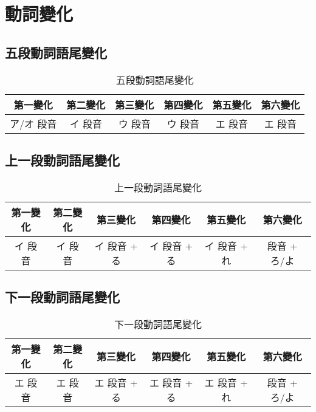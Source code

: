 \documentclass[12pt]{article}
\begin{document}
\begin{CJK}{UTF8}{cybercjk}
\begin{table}[htdp]
\begin{tabular}{cccccccccc}
\hline
\end{tabular}
\end{table}

\section{動詞變化}

\subsection{五段動詞語尾變化}
\begin{table}[htdp]
\begin{tabular}{cccccc}
\hline
第一變化 & 第二變化 & 第三變化 & 第四變化 & 第五變化 & 第六變化 \\
\hline
ア/オ 段音 & イ 段音 & ウ 段音 & ウ 段音  & エ 段音 & エ 段音  \\
\hline
\end{tabular}
\caption{五段動詞語尾變化}
\end{table}

\subsection{上一段動詞語尾變化}
\begin{table}[htdp]
\begin{tabular}{cccccc}
\hline
第一變化 & 第二變化 & 第三變化 & 第四變化 & 第五變化 & 第六變化 \\
\hline
イ 段音 & イ 段音 & イ 段音 + る &  イ 段音 + る &  イ 段音 + れ &  段音 + ろ/よ \\
\hline
\end{tabular}
\caption{上一段動詞語尾變化}
\end{table}

\subsection{下一段動詞語尾變化}
\begin{table}[htdp]
\begin{tabular}{cccccc}
\hline
第一變化 & 第二變化 & 第三變化 & 第四變化 & 第五變化 & 第六變化 \\
\hline
エ 段音 & エ 段音 & エ 段音 + る &  エ 段音 + る &  エ 段音 + れ &  段音 + ろ/よ \\
\hline
\end{tabular}
\caption{下一段動詞語尾變化}
\end{table}


\end{CJK}
\end{document}
